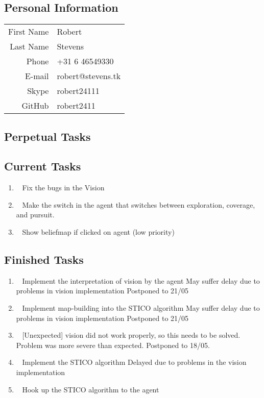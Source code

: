\subsection{Personal Information}
\begin{table}[h!]
	\begin{tabular}{rl}
	First Name 	& Robert\\
	Last Name	& Stevens\\
	Phone		& +31 6 46549330\\
	E-mail		& robert@stevens.tk\\
	Skype		& robert24111\\
	GitHub		& robert2411
\end{tabular}
\end{table}

\subsection{Perpetual Tasks}

\subsection{Current Tasks}
\begin{enumerate}
	\item~
		Fix the bugs in the Vision
	\item~
		Make the switch in the agent that switches between exploration, coverage, and pursuit.
	\item~\marginpar{-}
		Show beliefmap if clicked on agent (low priority)
\end{enumerate}

\subsection{Finished Tasks}
\begin{enumerate}
	\item~
	Implement the interpretation of vision by the agent
		\subitem May suffer delay due to problems in vision implementation
		\subitem Postponed to 21/05
	\item~
	Implement map-building into the STICO algorithm
		\subitem May suffer delay due to problems in vision implementation
		\subitem Postponed to 21/05
	\item~
	[Unexpected] vision did not work properly, so this needs to be solved.
		\subitem Problem was more severe than expected. Postponed to 18/05.
	\item~
	Implement the STICO algorithm
		\subitem Delayed due to problems in the vision implementation
	\item~
	Hook up the STICO algorithm to the agent
\end{enumerate}
